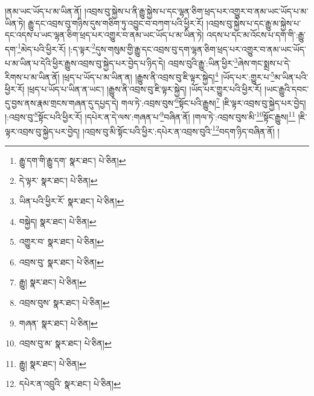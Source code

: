 །ནམ་ཡང་ཡོད་པ་མ་ཡིན་ནོ། །འབྲས་བུ་སྐྱེས་པ་ནི་རྒྱུ་སྐྱེས་པ་དང་ལྷན་ཅིག་ཕྲད་པར་འགྱུར་བ་ནམ་ཡང་ཡོད་པ་མ་ཡིན་ཏེ། རྒྱུ་དང་འབྲས་བུ་གཉིས་དུས་གཅིག་ཏུ་འབྱུང་བ་བཀག་པའི་ཕྱིར་རོ། །འབྲས་བུ་སྐྱེས་པ་དང་རྒྱུ་མ་སྐྱེས་པ་དང་འདས་པ་ཡང་ལྷན་ཅིག་ཕྲད་པར་འགྱུར་བ་ནམ་ཡང་ཡོད་པ་མ་ཡིན་ཏེ། འདས་པ་དང་མ་འོངས་པ་དག་གི་:རྒྱུ་དག་\footnote{རྒྱུ་དག་གི་རྒྱུ་དག་  སྣར་ཐང་།  པེ་ཅིན། }མེད་པའི་ཕྱིར་རོ། །:ད་ལྟར་\footnote{དེ་ལྟར་  སྣར་ཐང་།  པེ་ཅིན། }དུས་གསུམ་གྱི་རྒྱུ་དང་འབྲས་བུ་དག་ལྷན་ཅིག་ཕྲད་པར་འགྱུར་བ་ནམ་ཡང་ཡོད་པ་མ་ཡིན་པ་དེའི་ཕྱིར་རྒྱུས་འབྲས་བུ་སྐྱེད་པར་བྱེད་པ་ཉིད་དེ། འབྲས་བུའི་རྒྱུ་:ཡིན་ཕྱིར་\footnote{ཡིན་པའི་ཕྱིར་རོ་  སྣར་ཐང་།  པེ་ཅིན། }ཞེས་གང་སྨྲས་པ་དེ་རིགས་པ་མ་ཡིན་ནོ། །ཕྲད་པ་ཡོད་པ་མ་ཡིན་ན། །རྒྱུས་ནི་འབྲས་བུ་ཇི་ལྟར་སྐྱེད།\footnote{བསྐྱེད།  སྣར་ཐང་།  པེ་ཅིན། } །ཡོད་པར་:གྱུར་པ་\footnote{འགྱུར་བ་  སྣར་ཐང་།  པེ་ཅིན། }མ་ཡིན་པའི་ཕྱིར་རོ། །ཕྲད་པ་ཡོད་པ་ཡིན་ན་ཡང་། །རྒྱུས་ནི་འབྲས་བུ་ཇི་ལྟར་སྐྱེད། །ཡོད་པར་གྱུར་པའི་ཕྱིར་རོ། །ཡང་རྒྱུའི་དབང་དུ་བྱས་ནས་རྣམ་གྲངས་གཞན་དུ་དཔྱད་དེ། གལ་ཏེ་:འབྲས་བུས་\footnote{འབྲས་བུ་  སྣར་ཐང་།  པེ་ཅིན། }སྟོང་པའི་རྒྱུས།\footnote{རྒྱུ།  སྣར་ཐང་།  པེ་ཅིན། } །ཇི་ལྟར་འབྲས་བུ་སྐྱེད་པར་བྱེད། །:འབྲས་བུ་\footnote{འབྲས་བུས་  སྣར་ཐང་།  པེ་ཅིན། }སྟོང་པའི་ཕྱིར་རོ། །དཔེར་ན་དེ་ལས་:གཞན་པ་\footnote{གཞན་  སྣར་ཐང་།  པེ་ཅིན། }བཞིན་ནོ། །གལ་ཏེ་:འབྲས་བུས་མི་\footnote{འབྲས་བུ་མ་  སྣར་ཐང་།  པེ་ཅིན། }སྟོང་རྒྱུས།\footnote{རྒྱུ།  སྣར་ཐང་།  པེ་ཅིན། } །ཇི་ལྟར་འབྲས་བུ་སྐྱེད་པར་བྱེད། །འབྲས་བུ་མི་སྟོང་པའི་ཕྱིར་:དཔེར་ན་འབྲས་བུའི་\footnote{དཔེར་ན་འབྲུའི་  སྣར་ཐང་།  པེ་ཅིན། }བདག་ཉིད་བཞིན་ནོ། །
